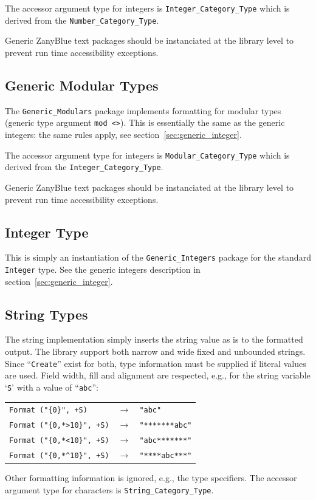 The accessor argument type for integers is \texttt{Integer\_Category\_Type}
which is derived from the \texttt{Number\_Category\_Type}.

Generic ZanyBlue text packages should be instanciated at the library
level to prevent run time accessibility exceptions.

\subsection{Generic Modular Types}

The \verb|Generic_Modulars| package implements formatting for modular
types (generic type argument \verb|mod <>|).  This is essentially the same
as the generic integers: the same rules apply, see
section~\ref{sec:generic_integer}.

The accessor argument type for integers is \texttt{Modular\_Category\_Type}
which is derived from the \texttt{Integer\_Category\_Type}.

Generic ZanyBlue text packages should be instanciated at the library
level to prevent run time accessibility exceptions.

\subsection{Integer Type}

This is simply an instantiation of the \verb|Generic_Integers| package
for the standard \verb|Integer| type.  See the generic integers description
in section~\ref{sec:generic_integer}.

\subsection{String Types}

The string implementation simply inserts the string value as is
to the formatted output.  The library support both narrow and wide
fixed and unbounded strings.  Since ``\texttt{Create}'' exist for both,
type information must be supplied if literal values are used.  Field width,
fill and alignment are respected, e.g., for the string variable `\texttt{S}'
with a value of ``\texttt{abc}'':
\begin{center}
\begin{tabular}{lll}
\verb|Format ("{0}", +S)| & $\rightarrow$ & \verb|"abc"|\\
\verb|Format ("{0,*>10}", +S)| & $\rightarrow$ & \verb|"*******abc"|\\
\verb|Format ("{0,*<10}", +S)| & $\rightarrow$ & \verb|"abc*******"|\\
\verb|Format ("{0,*^10}", +S)| & $\rightarrow$ & \verb|"****abc***"|
\end{tabular}
\end{center}
Other formatting information is ignored, e.g., the type specifiers.  The
accessor argument type for characters is \texttt{String\_Category\_Type}.

